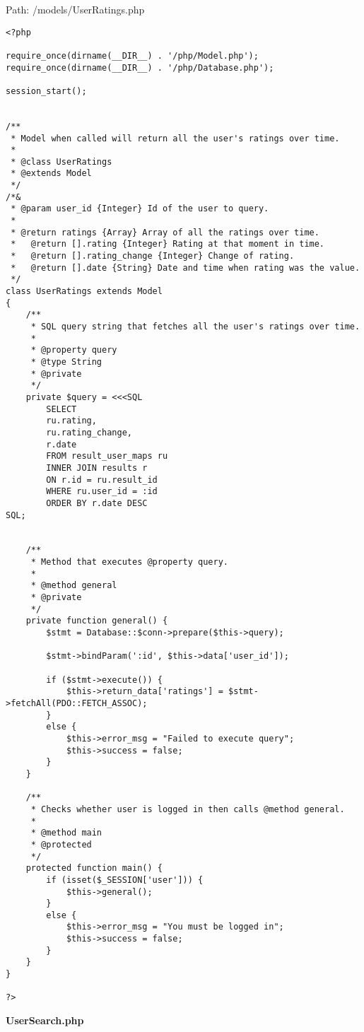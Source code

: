 Path: /models/UserRatings.php
{\scriptsize
\begin{lstlisting}
<?php

require_once(dirname(__DIR__) . '/php/Model.php');
require_once(dirname(__DIR__) . '/php/Database.php');

session_start();


/**
 * Model when called will return all the user's ratings over time.
 *
 * @class UserRatings
 * @extends Model
 */
/*&
 * @param user_id {Integer} Id of the user to query.
 *
 * @return ratings {Array} Array of all the ratings over time.
 *   @return [].rating {Integer} Rating at that moment in time.
 *   @return [].rating_change {Integer} Change of rating.
 *   @return [].date {String} Date and time when rating was the value.
 */
class UserRatings extends Model
{
	/**
	 * SQL query string that fetches all the user's ratings over time.
	 *
	 * @property query
	 * @type String
	 * @private
	 */
	private $query = <<<SQL
		SELECT
		ru.rating,
		ru.rating_change,
		r.date
		FROM result_user_maps ru
		INNER JOIN results r
		ON r.id = ru.result_id
		WHERE ru.user_id = :id
		ORDER BY r.date DESC
SQL;


	/**
	 * Method that executes @property query.
	 *
	 * @method general
	 * @private
	 */
	private function general() {
		$stmt = Database::$conn->prepare($this->query);

		$stmt->bindParam(':id', $this->data['user_id']);

		if ($stmt->execute()) {
			$this->return_data['ratings'] = $stmt->fetchAll(PDO::FETCH_ASSOC);
		}
		else {
			$this->error_msg = "Failed to execute query";
			$this->success = false;
		}
	}

	/**
	 * Checks whether user is logged in then calls @method general.
	 *
	 * @method main
	 * @protected
	 */
	protected function main() {
		if (isset($_SESSION['user'])) {
			$this->general();
		}
		else {
			$this->error_msg = "You must be logged in";
			$this->success = false;
		}
	}
}

?>\end{lstlisting}
}
\textbf{UserSearch.php}

